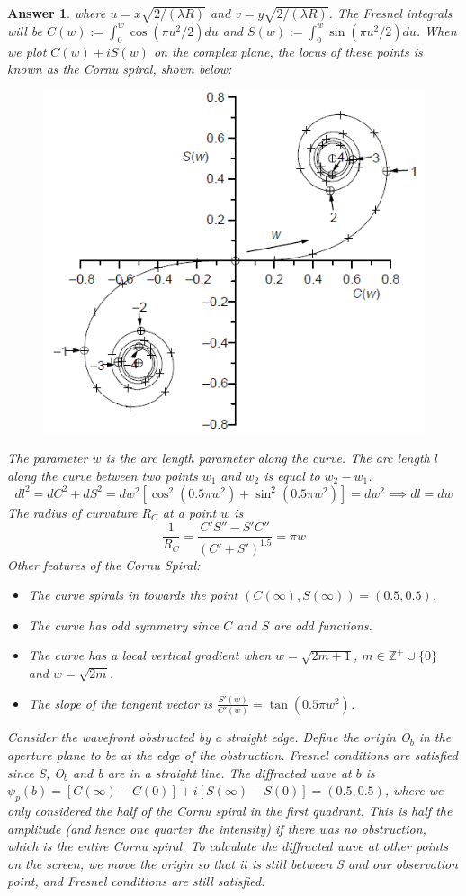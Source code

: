 \documentclass[a4paper]{article}
\newtheorem{ans}{Answer}[subsection]
\theoremstyle{new}
\begin{document}
\begin{ans}
where $u=x\sqrt{2/(\lambda R)}$ and $v=y\sqrt{2/(\lambda R)}$. The Fresnel integrals will be $C(w):=\int_0^w\cos(\pi u^2/2)du$ and $S(w):=\int_0^w\sin(\pi u^2/2)du$. When we plot $C(w)+iS(w)$ on the complex plane, the locus of these points is known as the Cornu spiral, shown below:
\begin{figure}[H]
    \centering
    \includegraphics[scale=0.5]{2010P1B9Q.PNG}
\end{figure}
The parameter $w$ is the arc length parameter along the curve. The arc length $l$ along the curve between two points $w_1$ and $w_2$ is equal to $w_2-w_1$.
$$dl^2=dC^2+dS^2=dw^2[\cos^2(0.5\pi w^2)+\sin^2(0.5\pi w^2)]=dw^2\implies dl=dw$$
The radius of curvature $R_C$ at a point $w$ is
$$\frac{1}{R_C}=\frac{C'S''-S'C''}{(C'+S')^{1.5}}=\pi w$$
Other features of the Cornu Spiral:
\begin{itemize}
    \item The curve spirals in towards the point $(C(\infty), S(\infty))=(0.5,0.5)$. 
    \item The curve has odd symmetry since $C$ and $S$ are odd functions.
    \item The curve has a local  vertical gradient when $w=\sqrt{2m+1}$, $m\in\mathbb{Z}^+\cup\{0\}$ and $w=\sqrt{2m}$.
    \item The slope of the tangent vector is $\frac{S'(w)}{C'(w)}=\tan(0.5\pi w^2)$.
\end{itemize}
Consider the wavefront obstructed by a straight edge. Define the origin O$_b$ in the aperture plane to be at the edge of the obstruction. Fresnel conditions are satisfied since S, O$_b$ and b are in a straight line. The diffracted wave at $b$ is $\psi_p(b)=[C(\infty)-C(0)]+i[S(\infty)-S(0)]=(0.5,0.5)$, where we only considered the half of the Cornu spiral in the first quadrant. This is half the amplitude (and hence one quarter the intensity) if there was no obstruction, which is the entire Cornu spiral. To calculate the diffracted wave at other points on the screen, we move the origin so that it is still between S and our observation point, and Fresnel conditions are still satisfied.

\end{ans}
\end{document}
